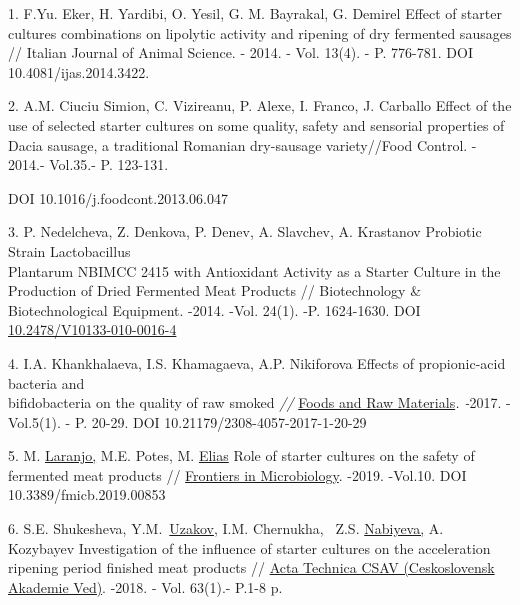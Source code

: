 \begin{references}
1. F.Yu. Eker, H. Yardibi, O. Yesil, G. M. Bayrakal, G. Demirel Effect
of starter cultures combinations on lipolytic activity and ripening of
dry fermented sausages // Italian Journal of Animal Science. - 2014. -
Vol. 13(4). - P. 776-781. DOI 10.4081/ijas.2014.3422.

2. A.M. Ciuciu Simion, C. Vizireanu, P. Alexe, I. Franco, J. Carballo
Effect of the use of selected starter cultures on some quality, safety
and sensorial properties of Dacia sausage, a traditional Romanian
dry-sausage variety//Food Control. - 2014.- Vol.35.- P. 123-131.

DOI 10.1016/j.foodcont.2013.06.047

3. P. Nedelcheva, Z. Denkova, P. Denev, A. Slavchev, A. Krastanov
Probiotic Strain Lactobacillus \\Plantarum NBIMCC 2415 with Antioxidant
Activity as a Starter Culture in the Production of Dried Fermented Meat
Products // Biotechnology \& Biotechnological Equipment. -2014. -Vol.
24(1). -P. 1624-1630. DOI
\href{https://doi.org/10.2478/V10133-010-0016-4}{10.2478/V10133-010-0016-4}

4. I.A. Khankhalaeva, I.S. Khamagaeva, A.P. Nikiforova Effects of
propionic-acid bacteria and \\bifidobacteria on the quality of raw smoked
\emph{//}
\href{https://library.kazatu.kz:2057/sourceid/21100777291}{Foods and Raw
Materials}\emph{. -}2017. - Vol.5(1). - P. 20-29. DOI
10.21179/2308-4057-2017-1-20-29

5. M.
\href{https://library.kazatu.kz:2057/authid/detail.uri?origin=resultslist&authorId=7801545833&zone=}{Laranjo,}
M.E. Potes, M.
\href{https://library.kazatu.kz:2057/authid/detail.uri?origin=resultslist&authorId=35086070100&zone=}{Elias}
Role of starter cultures on the safety of fermented meat products //
\href{https://library.kazatu.kz:2057/sourceid/21100226442?origin=resultslist}{Frontiers
in Microbiology}. -2019. -Vol.10. DOI 10.3389/fmicb.2019.00853

6. S.E. Shukesheva,
Y.M.~\href{https://library.kazatu.kz:2057/authid/detail.uri?origin=resultslist&authorId=55968622400&zone=}{Uzakov,}
I.M. Chernukha, ~Z.S.
\href{https://library.kazatu.kz:2057/authid/detail.uri?origin=resultslist&authorId=56031451100&zone=}{Nabiyeva,}
A. Kozybayev Investigation of the influence of starter cultures on the
acceleration ripening period finished meat products //
\href{https://library.kazatu.kz:2057/sourceid/13884?origin=resultslist}{Acta
Technica CSAV (Ceskoslovensk Akademie Ved)}. -2018. - Vol. 63(1).- P.1-8
p.


\end{references}
